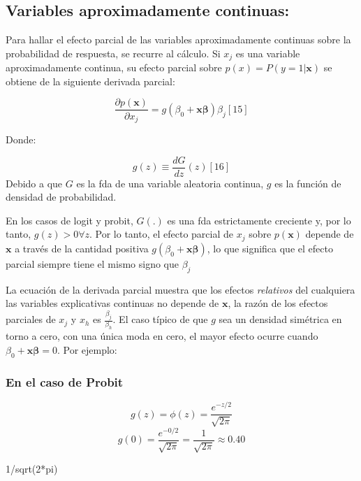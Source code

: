 \documentclass[
  letterpaper,
  DIV=11,
  numbers=noendperiod]{scrreprt}
\newenvironment{Shaded}{\begin{snugshade}}{\end{snugshade}}
\newcommand{\DecValTok}[1]{\textcolor[rgb]{0.68,0.00,0.00}{#1}}
\newcommand{\FunctionTok}[1]{\textcolor[rgb]{0.28,0.35,0.67}{#1}}
\newcommand{\NormalTok}[1]{\textcolor[rgb]{0.00,0.23,0.31}{#1}}
\newcommand{\SpecialCharTok}[1]{\textcolor[rgb]{0.37,0.37,0.37}{#1}}
\begin{document}
\subsection{Variables aproximadamente
continuas:}\label{variables-aproximadamente-continuas}

Para hallar el efecto parcial de las variables aproximadamente continuas
sobre la probabilidad de respuesta, se recurre al cálculo. Si \(x_j\) es
una variable aproximadamente continua, su efecto parcial sobre
\(p(x)=P(y=1|\mathbf{x})\) se obtiene de la siguiente derivada parcial:

\[\frac{\partial p(\mathbf{x})}{\partial x_j}=g(\beta_0+\mathbf{x\beta})\beta_j[15]\]

Donde:

\[g(z)\equiv\frac{dG}{dz}(z) [16]\] Debido a que \(G\) es la fda de una
variable aleatoria continua, \(g\) es la función de densidad de
probabilidad.

En los casos de logit y probit, \(G(.)\) es una fda estrictamente
creciente y, por lo tanto, \(g(z)>0\forall z\). Por lo tanto, el efecto
parcial de \(x_j\) sobre \(p(\mathbf{x})\) depende de \(\mathbf{x}\) a
través de la cantidad positiva \(g(\beta_0+\mathbf{x\beta})\), lo que
significa que el efecto parcial siempre tiene el mismo signo que
\(\beta_j\)

La ecuación de la derivada parcial muestra que los efectos
\emph{relativos} del cualquiera las variables explicativas continuas no
depende de \(\mathbf{x}\), la razón de los efectos parciales de \(x_j\)
y \(x_h\) es \(\frac{\beta_j}{\beta_h}\). El caso típico de que \(g\)
sea un densidad simétrica en torno a cero, con una única moda en cero,
el mayor efecto ocurre cuando \(\beta_0+\mathbf{x\beta}=0\). Por
ejemplo:

\subsubsection{En el caso de Probit}\label{en-el-caso-de-probit}

\[g(z)=\phi(z)=\frac{e^{-z/2}}{\sqrt{2\pi}}\]
\[g(0)=\frac{e^{-0/2}}{\sqrt{2\pi}}=\frac{1}{\sqrt{2\pi}}\approx 0.40\]

\begin{Shaded}
\begin{Highlighting}[]
\DecValTok{1}\SpecialCharTok{/}\FunctionTok{sqrt}\NormalTok{(}\DecValTok{2}\SpecialCharTok{*}\NormalTok{pi)}
\end{Highlighting}
\end{Shaded}
\end{document}
